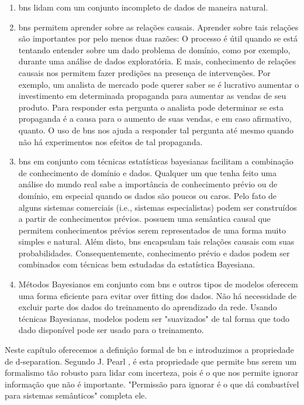 \begin{enumerate}
	\item \glspl{bn} lidam com um conjunto incompleto de dados de maneira natural.
	
	\item \glspl{bn} permitem aprender sobre as relações causais. Aprender sobre tais relações são importantes por pelo menos duas razões: O processo é útil quando se está tentando entender sobre um dado problema de domínio, como por exemplo, durante uma análise de dados exploratória.  E mais, conhecimento de relações causais nos permitem fazer predições na presença de intervenções. Por exemplo, um analista de mercado pode querer saber se é lucrativo aumentar o investimento em determinada propaganda para aumentar as vendas de seu produto. Para responder esta pergunta o analista pode determinar se esta propaganda é a causa para o aumento de suas vendas, e em caso afirmativo, quanto. O uso de \glspl{bn} nos ajuda a responder tal pergunta até mesmo quando não há experimentos nos efeitos de tal propaganda.
	
	\item \glspl{bn} em conjunto com técnicas estatísticas bayesianas facilitam a combinação de conhecimento de domínio e dados. Qualquer um que tenha feito uma análise do mundo real sabe a importância de conhecimento prévio ou de domínio, em especial quando os dados são poucos ou caros. Pelo fato de alguns sistemas comerciais (i.e., sistemas especialistas) podem ser construídos a partir de conhecimentos prévios.  possuem uma semântica causal que permitem conhecimentos prévios serem representados de uma forma muito simples e natural. Além disto, \glspl{bn} encapsulam tais relações causais com suas probabilidades. Consequentemente, conhecimento prévio e dados podem ser combinados com técnicas bem estudadas da estatística Bayesiana.
	
	\item Métodos Bayesianos em conjunto com \glspl{bn} e outros tipos de modelos oferecem uma forma eficiente para evitar over fitting dos dados. Não há necessidade de excluir parte dos dados do treinamento do aprendizado da rede. Usando técnicas Bayesianas, modelos podem ser "suavizados" de tal forma que todo dado disponível pode ser usado para o treinamento.
	
\end{enumerate}

Neste capítulo oferecemos a definição formal de \gls{bn} e introduzimos a propriedade de d-separation. Segundo J. Pearl \cite{pearl88}, é esta propriedade que permite \glspl{bn} serem um formalismo tão robusto para lidar com incerteza, pois é o que nos permite ignorar informação que não é importante. "Permissão para ignorar é o que dá combustível para sistemas semânticos" completa ele.

